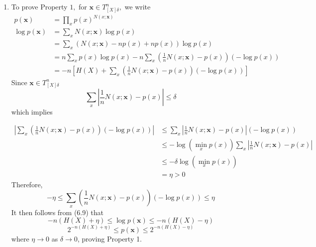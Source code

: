 \documentclass[8pt]{article}
\begin{document}
\begin{enumerate}
	\item To prove Property $1,$ for $\mathbf{x} \in T_{[X] \delta}^{n},$ we write
$$
\begin{aligned}
	p(\mathbf{x})&=\prod_{x} p(x)^{N(x ; \mathbf{x})} \\
	\log p(\mathbf{x})
	&=\sum_{x} N(x ; \mathbf{x}) \log p(x) \\
	&=\sum_{x}(N(x ; \mathbf{x})-n p(x)+n p(x)) \log p(x) \\
	&=n \sum_{x} p(x) \log p(x)-n \sum_{x}\left(\frac{1}{n} N(x ; \mathbf{x})-p(x)\right)(-\log p(x)) \\
	&=-n\left[H(X)+\sum_{x}\left(\frac{1}{n} N(x ; \mathbf{x})-p(x)\right)(-\log p(x))\right]
\end{aligned}
$$
Since $\mathbf{x} \in T_{[X] \delta}^{n}$
$$
\sum_{x}\left|\frac{1}{n} N(x ; \mathbf{x})-p(x)\right| \leq \delta
$$
which implies

$$
\begin{aligned}
	\left|\sum_{x}\left(\frac{1}{n} N(x ; \mathbf{x})-p(x)\right)(-\log p(x))\right|
	& \leq \sum_{x}\left|\frac{1}{n} N(x ; \mathbf{x})-p(x)\right|(-\log p(x)) \\
	&\leq-\log \left(\min _{x} p(x)\right) \sum_{x}\left|\frac{1}{n} N(x ; \mathbf{x})-p(x)\right| \\
	&\leq-\delta \log \left(\min _{x} p(x)\right) \\
	&=\eta > 0
\end{aligned}
$$
Therefore,
$$
-\eta \leq \sum_{x}\left(\frac{1}{n} N(x ; \mathbf{x})-p(x)\right)(-\log p(x)) \leq \eta
$$
It then follows from (6.9) that
$$-n(H(X)+\eta) \leq \log p(\mathbf{x}) \leq-n(H(X)-\eta)$$
$$2^{-n(H(X)+\eta)} \leq p(\mathbf{x}) \leq 2^{-n(H(X)-\eta)}$$
where $\eta \rightarrow 0$ as $\delta \rightarrow 0$, proving Property 1.\\


\end{enumerate}
\end{document}
